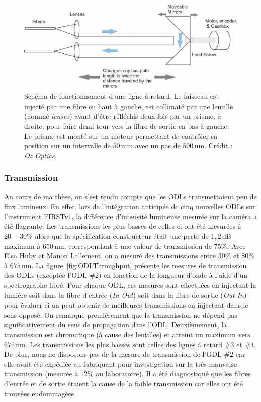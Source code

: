 \begin{figure}[ht!]
    \centering
    \includegraphics[width=\figwidth]{Figure_Chap2/ODL_Scheme.png}
    \caption[Schéma de fonctionnement d'une ligne à retard.]{Schéma de fonctionnement d'une ligne à retard. Le faisceau est injecté par une fibre en haut à gauche, est collimaté par une lentille (nommé \textit{lenses}) avant d'être réfléchis deux fois par un prisme, à droite, pour faire demi-tour vers la fibre de sortie en bas à gauche. Le prisme est monté sur un moteur permettant de contrôler sa position sur un intervalle de $50\,$mm avec un pas de $500 \,$nm. Crédit : \textit{Oz Optics}.}
    \label{fig:ODLScheme}
\end{figure}


\subsubsection{Transmission}
\label{sec:OdlThroughput}

Au cours de ma thèse, on s'est rendu compte que les \ac{ODL}s transmettaient peu de flux lumineux. En effet, lors de l'intégration anticipée de cinq nouvelles \ac{ODL}s sur l'instrument \ac{FIRSTv1}, la différence d'intensité lumineuse mesurée sur la caméra a été flagrante. Les transmissions les plus basses de celles-ci ont été mesurées à $20 - 30 \%$ alors que la spécification constructeur était une perte de $1,2\,$dB maximum à $650 \,$nm, correspondant à une valeur de transmission de $75\%$. Avec Elsa Huby et Manon Lallement, on a mesuré des transmissions entre $30\%$ et $80\%$ à $675 \,$nm. La figure~\ref{fig:ODLThroughput} présente les mesures de transmission des \ac{ODL}s (exceptée l'\ac{ODL} $\#2$) en fonction de la longueur d'onde à l'aide d'un spectrographe fibré. Pour chaque \ac{ODL}, ces mesures sont effectuées en injectant la lumière soit dans la fibre d'entrée (\textit{In Out}) soit dans la fibre de sortie (\textit{Out In}) pour évaluer si on peut obtenir de meilleures transmissions en injectant dans le sens opposé. On remarque premièrement que la transmission ne dépend pas significativement du sens de propagation dans l'\ac{ODL}. Deuxièmement, la transmission est chromatique (à cause des lentilles) et atteint un maximum vers $675 \,$nm. Les transmissions les plus basses sont celles des lignes à retard $\#3$ et $\#4$. De plus, nous ne disposons pas de la mesure de transmission de l'\ac{ODL} $\#2$ car elle avait été expédiée au fabriquant pour investigation sur la très mauvaise transmission (mesurée à $12\%$ au laboratoire). Il a été diagnostiqué que les fibres d'entrée et de sortie étaient la cause de la faible transmission car elles ont été trouvées endommagées.

